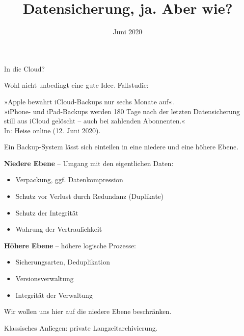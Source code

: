\documentclass[9pt]{beamer}
\title{Datensicherung, ja. Aber wie?}
\date{Juni 2020}
\newcommand{\strong}[1]{\textsf{\textbf{#1}}}
\begin{document}
\begin{frame}
\maketitle
\end{frame}

\begin{frame}
In die Cloud?\pause

\vspace{1em}
Wohl nicht unbedingt eine gute Idee. Fallstudie:

\vspace{1em}
»Apple bewahrt iCloud-Backups nur sechs Monate auf«.\\
{\footnotesize »iPhone- und iPad-Backups werden 180 Tage nach der letzten
Datensicherung still aus iCloud gelöscht -- auch bei zahlenden Abonnenten.«}\\
In: Heise online (12. Juni 2020).\\
{\tiny\href{https://www.heise.de/news/Apple-bewahrt-iCloud-Backups-nur-sechs-Monate-auf-4782483.html}%
{\color{urlcolor}{https://www.heise.de/news/Apple-bewahrt-iCloud-Backups-nur-sechs-Monate-auf-4782483.html}}}
\end{frame}

\begin{frame}
Ein Backup-System lässt sich einteilen in eine niedere und eine
höhere Ebene.\pause

\vspace{1em}
\strong{Niedere Ebene} -- Umgang mit den eigentlichen Daten:
\begin{itemize}
\item Verpackung, ggf. Datenkompression
\item Schutz vor Verlust durch Redundanz (Duplikate)
\item Schutz der Integrität
\item Wahrung der Vertraulichkeit
\end{itemize}\pause

\vspace{1em}
\strong{Höhere Ebene} -- höhere logische Prozesse:
\begin{itemize}
\item Sicherungsarten, Deduplikation
\item Versionsverwaltung
\item Integrität der Verwaltung
\end{itemize}
\end{frame}

\begin{frame}
Wir wollen uns hier auf die niedere Ebene beschränken.\pause

\vspace{1em}
Klassisches Anliegen: private Langzeitarchivierung.
\end{frame}
\end{document}
